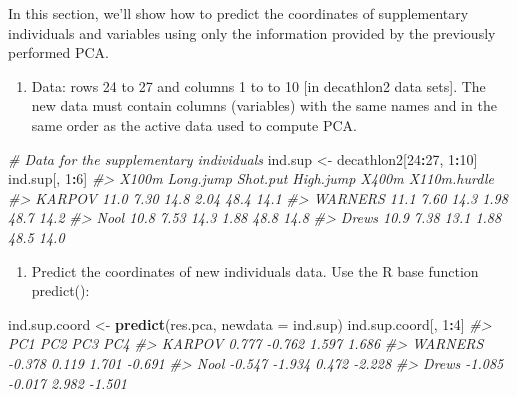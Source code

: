 \documentclass[]{book}
\newenvironment{Shaded}{\begin{snugshade}}{\end{snugshade}}
\newcommand{\CommentTok}[1]{\textcolor[rgb]{0.56,0.35,0.01}{\textit{#1}}}
\newcommand{\DataTypeTok}[1]{\textcolor[rgb]{0.13,0.29,0.53}{#1}}
\newcommand{\DecValTok}[1]{\textcolor[rgb]{0.00,0.00,0.81}{#1}}
\newcommand{\KeywordTok}[1]{\textcolor[rgb]{0.13,0.29,0.53}{\textbf{#1}}}
\newcommand{\NormalTok}[1]{#1}
\newcommand{\OperatorTok}[1]{\textcolor[rgb]{0.81,0.36,0.00}{\textbf{#1}}}
\newcommand{\StringTok}[1]{\textcolor[rgb]{0.31,0.60,0.02}{#1}}
\providecommand{\tightlist}{%
  \setlength{\itemsep}{0pt}\setlength{\parskip}{0pt}}
\begin{document}
In this section, we'll show how to predict the coordinates of supplementary individuals and variables using only the information provided by the previously performed PCA.

\begin{enumerate}
\def\labelenumi{\arabic{enumi}.}
\tightlist
\item
  Data: rows 24 to 27 and columns 1 to to 10 {[}in decathlon2 data sets{]}. The new data must contain columns (variables) with the same names and in the same order as the active data used to compute PCA.
\end{enumerate}

\begin{Shaded}
\begin{Highlighting}[]
\CommentTok{# Data for the supplementary individuals}
\NormalTok{ind.sup <-}\StringTok{ }\NormalTok{decathlon2[}\DecValTok{24}\OperatorTok{:}\DecValTok{27}\NormalTok{, }\DecValTok{1}\OperatorTok{:}\DecValTok{10}\NormalTok{]}
\NormalTok{ind.sup[, }\DecValTok{1}\OperatorTok{:}\DecValTok{6}\NormalTok{]}
\CommentTok{#>         X100m Long.jump Shot.put High.jump X400m X110m.hurdle}
\CommentTok{#> KARPOV   11.0      7.30     14.8      2.04  48.4         14.1}
\CommentTok{#> WARNERS  11.1      7.60     14.3      1.98  48.7         14.2}
\CommentTok{#> Nool     10.8      7.53     14.3      1.88  48.8         14.8}
\CommentTok{#> Drews    10.9      7.38     13.1      1.88  48.5         14.0}
\end{Highlighting}
\end{Shaded}

\begin{enumerate}
\def\labelenumi{\arabic{enumi}.}
\setcounter{enumi}{1}
\tightlist
\item
  Predict the coordinates of new individuals data. Use the R base function predict():
\end{enumerate}

\begin{Shaded}
\begin{Highlighting}[]
\NormalTok{ind.sup.coord <-}\StringTok{ }\KeywordTok{predict}\NormalTok{(res.pca, }\DataTypeTok{newdata =}\NormalTok{ ind.sup)}
\NormalTok{ind.sup.coord[, }\DecValTok{1}\OperatorTok{:}\DecValTok{4}\NormalTok{]}
\CommentTok{#>            PC1    PC2   PC3    PC4}
\CommentTok{#> KARPOV   0.777 -0.762 1.597  1.686}
\CommentTok{#> WARNERS -0.378  0.119 1.701 -0.691}
\CommentTok{#> Nool    -0.547 -1.934 0.472 -2.228}
\CommentTok{#> Drews   -1.085 -0.017 2.982 -1.501}
\end{Highlighting}
\end{Shaded}
\end{document}
